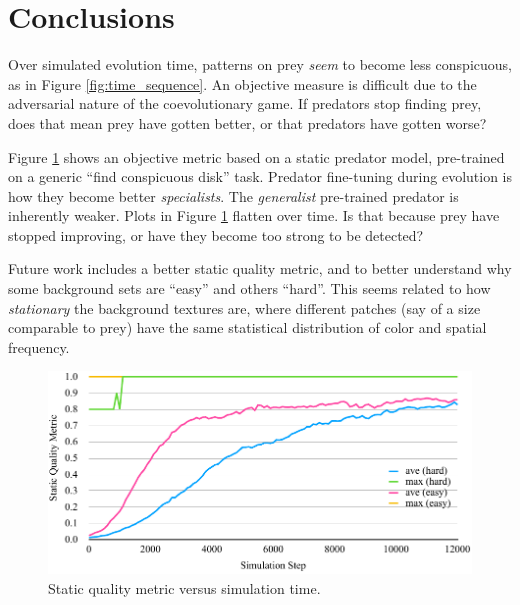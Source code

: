 \documentclass[sigconf]{acmart}
\newcommand{\jargon}[1]{\textit{#1}}
\begin{document}

\section{Conclusions}

Over simulated evolution time, patterns on prey \textit{seem} to become less conspicuous, as in Figure \ref{fig:time_sequence}. An objective measure is difficult due to the adversarial nature of the coevolutionary game. If predators stop finding prey, does that mean prey have gotten better, or that predators have gotten worse?
\par
Figure \ref{fig:sqm_plot} shows an objective metric based on a static predator model, pre-trained on a generic “find conspicuous disk” task. Predator fine-tuning during evolution is how they become better \jargon{specialists}. The \jargon{generalist} pre-trained predator is inherently weaker. Plots in Figure \ref{fig:sqm_plot} flatten over time. Is that because prey have stopped improving, or have they become too strong to be detected?
\par

Future work includes a better static quality metric, and to better understand why some background sets are “easy” and others “hard”. This seems related to how \jargon{stationary} the background textures are, where different patches (say of a size comparable to prey) have the same statistical distribution of color and spatial frequency.
\par


\begin{figure}[b]
    \includegraphics[width=\columnwidth]{SQM_plot_easy_vs_hard.pdf}
    \caption{Static quality metric versus simulation time.}
    \label{fig:sqm_plot}
\end{figure}




\end{document}
